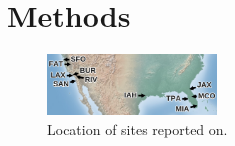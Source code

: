 \documentclass[10pt,a4paper,twocolumn]{article}
\begin{document}








\section*{Methods}

\begin{figure}
\centering
\includegraphics[width=0.4\textwidth]{sitemap.pdf}
\caption{\label{fig:sitemap}Location of sites reported on.}
\end{figure}
\end{document}
